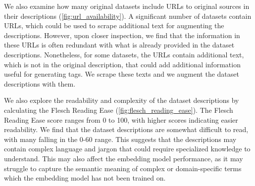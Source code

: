 We also examine how many original datasets include URLs to original sources in their descriptions (\cref{fig:url_availability}). A significant number of datasets contain URLs, which could be used to scrape additional text for augmenting the descriptions. However, upon closer inspection, we find that the information in these URLs is often redundant with what is already provided in the dataset descriptions. Nonetheless, for some datasets, the URLs contain additional text, which is not in the original description, that could add additional information useful for generating tags. We scrape these texts and we augment the dataset descriptions with them.


We also explore the readability and complexity of the dataset descriptions by calculating the Flesch Reading Ease \cite{flesch_new_1948} (\cref{fig:flesch_reading_ease}). The Flesch Reading Ease score ranges from 0 to 100, with higher scores indicating easier readability. We find that the dataset descriptions are somewhat difficult to read, with many falling in the 0-60 range. This suggests that the descriptions may contain complex language and jargon that could require specialized knowledge to understand. This may also affect the embedding model performance, as it may struggle to capture the semantic meaning of complex or domain-specific terms which the embedding model has not been trained on.


